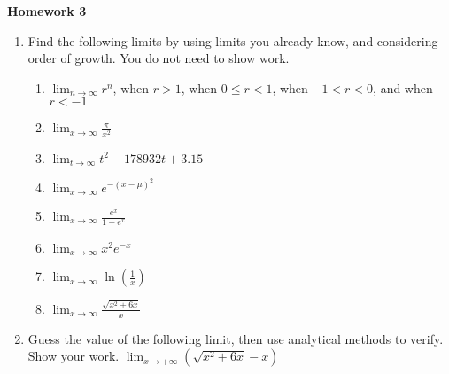 \documentclass{article}
\begin{document}
\begin{center}
    \large \textbf{Homework 3}
\end{center}

                \begin{enumerate}

    	\item Find the following limits by using limits you already know, and considering order of growth. You do not need to show work.
    	    \begin{enumerate}
    	        \item $\displaystyle \lim_{n \rightarrow \infty} r^n$, when $r > 1$, when $0\leq r<1$, when $-1 < r < 0$, and when $r < -1$
    	        \item $\displaystyle \lim_{x\rightarrow \infty} \frac{\pi}{x^2}$
    	        \item $\displaystyle \lim_{t\rightarrow \infty} t^2-178932t+3.15$
    	        \item $\displaystyle \lim_{x\rightarrow \infty} e^{-(x-\mu)^2}$
    	        \item $\displaystyle \lim_{x\rightarrow \infty} \frac{e^x}{1+e^x}$
    	        \item $\displaystyle \lim_{x\rightarrow \infty} x^2e^{-x}$
    	        \item $\displaystyle \lim_{x\rightarrow \infty} \ln \left(\frac{1}{x}\right)$ 
    	        \item $\displaystyle \lim_{x\rightarrow \infty} \frac{\sqrt{x^2+6x}}{x}$
    	    \end{enumerate}
    	     \item Guess the value of the following limit, then use analytical methods to verify. Show your work. $\displaystyle \lim_{x \rightarrow +\infty} (\sqrt{x^2+6x}-x)$ 
        	




\end{enumerate}
\end{document}
